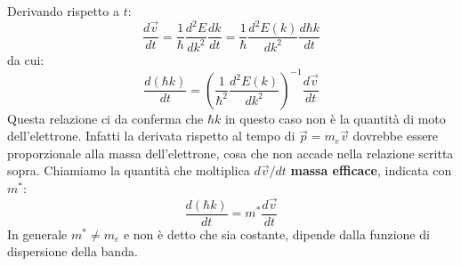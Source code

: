 \documentclass{book}
\begin{document}
                    Derivando rispetto a $t$:
                    $$\frac{d\vec{v}}{dt} = \frac{1}{\hbar} \frac{d ^{2} E}{dk^{2}} \frac{dk}{dt} = \frac{1}{\hbar} \frac{d^{2}E(k)}{dk^{2}} \frac{d\hbar k}{dt}$$
                    da cui:
                    $$\frac{d(\hbar k)}{dt} = (\frac{1}{\hbar ^{2}} \frac{d^{2}E(k)}{dk^{2}}) ^{-1} \frac{d\vec{v}}{dt}$$
                    Questa relazione ci da conferma che $\hbar k$ in questo caso non è la quantità di moto dell'elettrone. Infatti la derivata rispetto al tempo di $\vec{p} = m_{e}\vec{v}$ dovrebbe essere proporzionale alla massa dell'elettrone, cosa che non accade nella relazione scritta sopra. Chiamiamo la quantità che moltiplica $d\vec{v}/dt$ \textbf{massa efficace}, indicata con $m^{*}$:
                    $$\frac{d (\hbar k)}{dt} = m^{*} \frac{d\vec{v}}{dt}$$
                    In generale $m^{*} \neq m_{e}$ e non è detto che sia costante, dipende dalla funzione di dispersione della banda.
\end{document}
